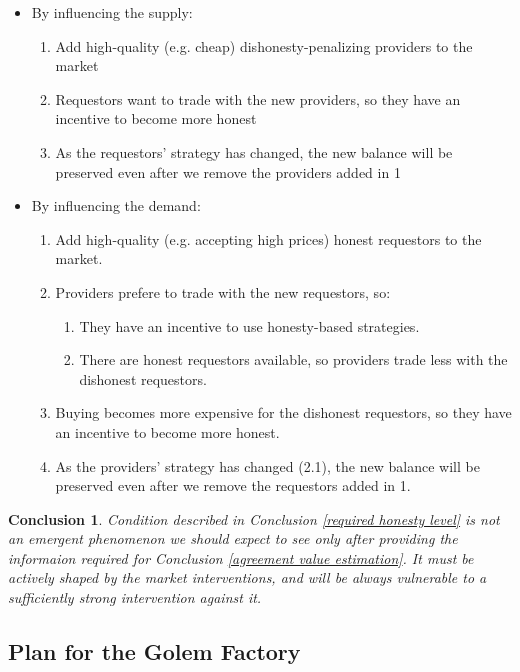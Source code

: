 \documentclass{article}
\newtheorem{conclusion}{Conclusion}[section]
\begin{document}
\begin{itemize}
    \item By influencing the supply:
        \begin{enumerate}
            \item Add high-quality (e.g. cheap) dishonesty-penalizing providers to the market
            \item Requestors want to trade with the new providers, so they have an incentive to become more honest
            \item As the requestors' strategy has changed, the new balance will be preserved even after we remove the providers added in 1
        \end{enumerate}
    \item By influencing the demand:
        \begin{enumerate}
        \item Add high-quality (e.g. accepting high prices) honest requestors to the market.
        \item Providers prefere to trade with the new requestors, so:
            \begin{enumerate}
                \item They have an incentive to use honesty-based strategies.
                \item There are honest requestors available, so providers trade less with the dishonest requestors.
            \end{enumerate}
        \item Buying becomes more expensive for the dishonest requestors, so they have an incentive to become more honest.
        \item As the providers' strategy has changed (2.1), the new balance will be preserved even after we remove the requestors added in 1.
        \end{enumerate}
\end{itemize}

\begin{conclusion}
Condition described in Conclusion \ref{required honesty level} is not an emergent phenomenon we should expect to see only after providing
the informaion required for Conclusion \ref{agreement value estimation}. It must be actively shaped by the market interventions,
and will be always vulnerable to a sufficiently strong intervention against it.
\end{conclusion}

\subsection{Plan for the Golem Factory}
\end{document}
